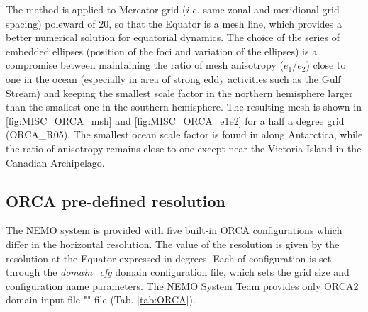 \documentclass[../main/NEMO_manual]{subfiles}
\begin{document}
The method is applied to Mercator grid ($i.e.$ same zonal and meridional grid spacing) poleward of 20\degN,
so that the Equator is a mesh line, which provides a better numerical solution for equatorial dynamics.
The choice of the series of embedded ellipses (position of the foci and variation of the ellipses)
is a compromise between maintaining the ratio of mesh anisotropy ($e_1 / e_2$) close to one in the ocean
(especially in area of strong eddy activities such as the Gulf Stream) and keeping the smallest scale factor in
the northern hemisphere larger than the smallest one in the southern hemisphere.
The resulting mesh is shown in \autoref{fig:MISC_ORCA_msh} and \autoref{fig:MISC_ORCA_e1e2} for
a half a degree grid (ORCA\_R05).
The smallest ocean scale factor is found in along Antarctica,
while the ratio of anisotropy remains close to one except near the Victoria Island in the Canadian Archipelago. 

\subsection{ORCA pre-defined resolution}
\label{subsec:CFG_orca_resolution}

The NEMO system is provided with five built-in ORCA configurations which differ in the horizontal resolution.
The value of the resolution is given by the resolution at the Equator expressed in degrees.
Each of configuration is set through the \textit{domain\_cfg} domain configuration file,
which sets the grid size and configuration name parameters.
The NEMO System Team provides only ORCA2 domain input file "" file
(Tab. \autoref{tab:ORCA}).
\end{document}

